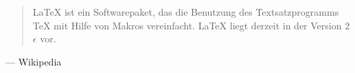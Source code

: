 \newcommand{\myquoteendparam}{}
\newenvironment{myquote}[1]{
	\renewcommand{\myquoteendparam}{#1}
	\begin{quote}
}{	
	\end{quote}
	\begin{flushright}--- \myquoteendparam{}\end{flushright}
}
 
\begin{myquote}{Wikipedia}
	{\LaTeX} ist ein Softwarepaket, das die Benutzung des Textsatzprogramms TeX mit Hilfe von Makros vereinfacht. LaTeX liegt derzeit in der Version 2$\epsilon$ vor.
\end{myquote}
